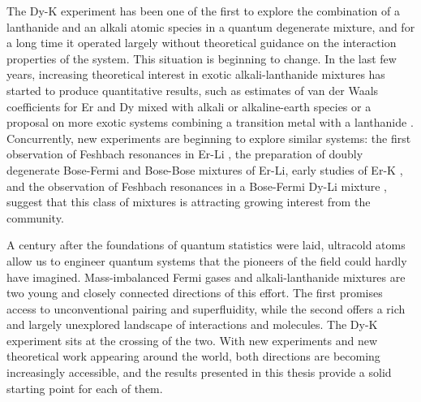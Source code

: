 The Dy-K experiment has been one of the first to explore the combination of a lanthanide and an alkali atomic species in a quantum degenerate mixture, and for a long time it operated largely without theoretical guidance on the interaction properties of the system. This situation is beginning to change. In the last few years, increasing theoretical interest in exotic alkali-lanthanide mixtures has started to produce quantitative results, such as estimates of van der Waals coefficients for Er and Dy mixed with alkali or alkaline-earth species \cite{Kopczyk2024vdw} or a proposal on more exotic systems combining a transition metal with a lanthanide \cite{Ciamei2026uhs}. Concurrently, new experiments are beginning to explore similar systems: the first observation of Feshbach resonances in Er-Li \cite{Schafer2022fro}, the preparation of doubly degenerate Bose-Fermi \cite{Karpov2026ico} and Bose-Bose \cite{Kalia2026coa} mixtures of Er-Li, early studies of Er-K \cite{Klaus2026}, and the observation of Feshbach resonances in a Bose-Fermi Dy-Li mixture \cite{Xie2025fso}, suggest that this class of mixtures is attracting growing interest from the community. 

A century after the foundations of quantum statistics were laid, ultracold atoms allow us to engineer quantum systems that the pioneers of the field could hardly have imagined. Mass-imbalanced Fermi gases and alkali-lanthanide mixtures are two young and closely connected directions of this effort. The first promises access to unconventional pairing and superfluidity, while the second offers a rich and largely unexplored landscape of interactions and molecules. The Dy-K experiment sits at the crossing of the two. With new experiments and new theoretical work appearing around the world, both directions are becoming increasingly accessible, and the results presented in this thesis provide a solid starting point for each of them. 







 






